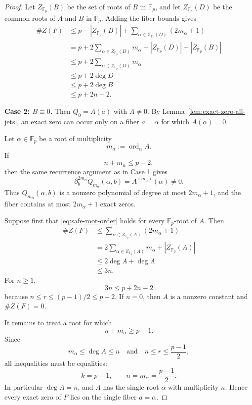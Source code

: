 \documentclass[11pt]{article}
\newcommand{\F}{\mathbb F}
\begin{document}
\begin{proof}
Let \(Z_{\F_p}(B)\) be the set of roots of \(B\) in \(\F_p\), and let
\(Z_{\F_p}(D)\) be the common roots of \(A\) and \(B\) in \(\F_p\).
Adding the fiber bounds gives
\[
 \begin{aligned}
 \#Z(F)
 &\le
 p-|Z_{\F_p}(B)|
 +\sum_{\alpha\in Z_{\F_p}(D)}(2m_\alpha+1)\\
 &=
 p
 +2\sum_{\alpha\in Z_{\F_p}(D)}m_\alpha
 +|Z_{\F_p}(D)|-|Z_{\F_p}(B)|\\
 &\le
 p+2\sum_{\alpha\in Z_{\F_p}(D)}m_\alpha\\
 &\le
 p+2\deg D\\
 &\le
 p+2\deg B\\
 &\le
 p+2n-2.
 \end{aligned}
 \label{eq:count-case-one-rigorous}
\]

\medskip
\noindent
\textbf{Case 2: \(B\equiv0\).}
Then \(Q_0=A(a)\) with \(A\ne0\).  By
Lemma~\ref{lem:exact-zero-all-jets}, an exact zero can occur only on a
fiber \(a=\alpha\) for which \(A(\alpha)=0\).

Let \(\alpha\in\F_p\) be a root of multiplicity
\[
 m_\alpha:=\operatorname{ord}_\alpha A.
\]
If
\[
 n+m_\alpha\le p-2,
 \label{eq:safe-root-order}
\]
then the same recurrence argument as in Case 1 gives
\[
 \partial_b^{2m_\alpha}Q_{m_\alpha}(\alpha,b)
 =
 A^{(m_\alpha)}(\alpha)\ne0.
\]
Thus \(Q_{m_\alpha}(\alpha,b)\) is a nonzero polynomial of degree at
most \(2m_\alpha+1\), and the fiber contains at most
\(2m_\alpha+1\) exact zeros.

Suppose first that \eqref{eq:safe-root-order} holds for every
\(\F_p\)-root of \(A\).  Then
\[
 \begin{aligned}
 \#Z(F)
 &\le
 \sum_{\alpha\in Z_{\F_p}(A)}(2m_\alpha+1)\\
 &=
 2\sum_{\alpha\in Z_{\F_p}(A)}m_\alpha
 +|Z_{\F_p}(A)|\\
 &\le
 2\deg A+\deg A\\
 &\le3n.
 \end{aligned}
\]
For \(n\ge1\),
\[
 3n\le p+2n-2
\]
because \(n\le r\le(p-1)/2\le p-2\).  If \(n=0\), then \(A\) is a
nonzero constant and \(\#Z(F)=0\).

It remains to treat a root for which
\[
 n+m_\alpha\ge p-1.
\]
Since
\[
 m_\alpha\le\deg A\le n
 \quad\text{and}\quad
 n\le r\le\frac{p-1}{2},
\]
all inequalities must be equalities:
\[
 k=p-1,
 \qquad
 n=m_\alpha=\frac{p-1}{2}.
 \label{eq:boundary-equalities}
\]
In particular \(\deg A=n\), and \(A\) has the single root
\(\alpha\) with multiplicity \(n\).  Hence every exact zero of \(F\)
lies on the single fiber \(a=\alpha\).


\end{proof}
\end{document}
